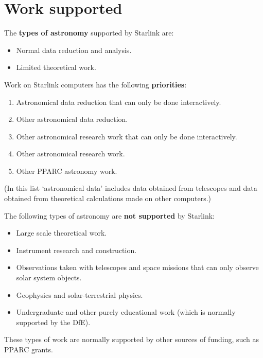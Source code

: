 \documentclass[twoside,11pt]{article}
\begin{document}
\newpage

\section*{Work supported}

The {\bf types of astronomy} supported by Starlink are:

\begin{itemize}
\item Normal data reduction and analysis.
\item Limited theoretical work.
\end{itemize}

Work on Starlink computers has the following {\bf priorities}:

\begin{enumerate}
\item Astronomical data reduction that can only be done interactively.
\item Other astronomical data reduction.
\item Other astronomical research work that can only be done interactively.
\item Other astronomical research work.
\item Other PPARC astronomy work.
\end{enumerate}

(In this list `astronomical data' includes data obtained from telescopes
and data obtained from theoretical calculations made on other computers.)

\newpage

The following types of astronomy are {\bf not supported} by Starlink:

\begin{itemize}
\item Large scale theoretical work.
\item Instrument research and construction.
\item Observations taken with telescopes and space missions that can only
 observe solar system objects.
\item Geophysics and solar-terrestrial physics.
\item Undergraduate and other purely educational work (which is normally
 supported by the DfE).
\end{itemize}

These types of work are normally supported by other sources of funding, such as
PPARC grants.


\newpage
\end{document}
